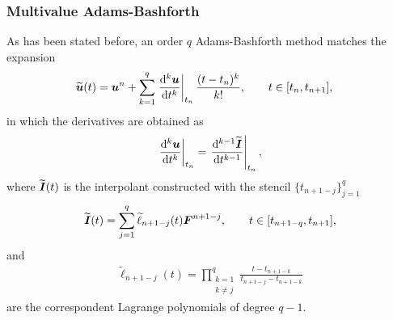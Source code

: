 \subsubsection*{Multivalue Adams-Bashforth}
As has been stated before, an order $q$ Adams-Bashforth method matches the expansion
%
\begin{align}
	\widetilde{\vect{u}}(t)
	& =
	\vect{u}^n
	+
	\sum_{k = 1}^{q}
	\eval{ \dv[k]{\vect{u}}{t} }_{t_n}
	\frac{(t-t_n)^k}{k!}
	,
	\qquad 
	t \in [t_n,t_{n+1}],
	\label{eq:AB_Multivalue_Taylor}
\end{align}
in which the derivatives are obtained as
%
\begin{align}
	\eval{ \dv[k]{ \vect{u} }{t} }_{t_n}
	=
	\eval{ \dv[k-1]{\widetilde{\vect{I}}}{t} }_{t_n},
	\label{eq:Multivalue_extrapolation_derivatives}
\end{align}
where $\boldsymbol{\widetilde{\boldsymbol{I}}}(t)$ is the interpolant constructed with the stencil $\{t_{n+1-j}\}_{j=1}^{q}$
%
\begin{align}
	\boldsymbol{\widetilde{\boldsymbol{I}}}(t)
	=
	\sum_{j=1}^{q}
	\widetilde{\ell}_{n+1-j}(t)
	\boldsymbol{F}^{n+1-j}
	,
	\qquad
	t\in[t_{n+1-q},t_{n+1}],
	\label{eq:AB_Multivalue_Interpolant}
\end{align}
and
%
\begin{align}
	\widetilde{\ell}_{n+1-j}(t)
	=
	\prod_{\substack{k=1\\k\ne j}}^{q}
	\frac{t-t_{n+1-k}}{t_{n+1-j}-t_{n+1-k}}
\end{align}
are the correspondent Lagrange polynomials of degree $q-1$.

